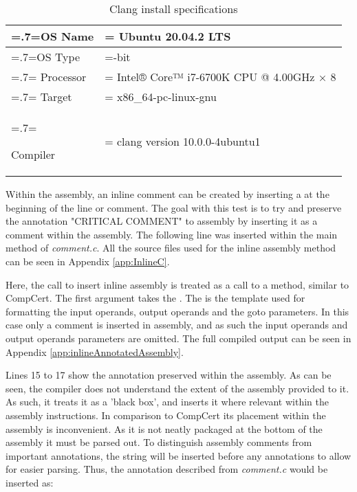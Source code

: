 \begin{table}
    \begin{center}
        \begin{tabularx}{\linewidth} { 
            | >{\hsize=.7\hsize\linewidth=\hsize}X 
            | >{\hsize=1.3\hsize\linewidth=\hsize}X  | }
            \hline
            OS Name & Ubuntu 20.04.2 LTS \\
            \hline
            OS Type & 64-bit \\
            \hline
            Processor & Intel® Core™ i7-6700K CPU @ 4.00GHz × 8 \\
            \hline
            Target & x86\_64-pc-linux-gnu \\
            \hline
            \raggedright
            Compiler & clang version 10.0.0-4ubuntu1 \\
            \hline
        \end{tabularx}
    \end{center}
    \caption{Clang install specifications}
    \label{tab:clangInstall}
\end{table}

Within the assembly, an inline comment can be created by inserting a \code{\#} at the beginning of the line or comment. The goal with this test is to try and preserve the annotation "CRITICAL COMMENT" to assembly by inserting it as a comment within the assembly. The following line was inserted within the main method of \textit{comment.c}. All the source files used for the inline assembly method can be seen in Appendix \ref{app:InlineC}.



Here, the call to insert inline assembly is treated as a call to a method, similar to CompCert. The first argument takes the . The  is the template used for formatting the input operands, output operands and the goto parameters. In this case only a comment is inserted in assembly, and as such the input operands and output operands parameters are omitted. The full compiled output can be seen in Appendix \ref{app:inlineAnnotatedAssembly}.



Lines 15 to 17 show the annotation preserved within the assembly. As can be seen, the compiler does not understand the extent of the assembly provided to it. As such, it treats it as a 'black box', and inserts it where relevant within the assembly instructions. In comparison to CompCert its placement within the assembly is inconvenient. As it is not neatly packaged at the bottom of the assembly it must be parsed out. To distinguish assembly comments from important annotations, the string  will be inserted before any annotations to allow for easier parsing. Thus, the annotation described from \textit{comment.c} would be inserted as:

